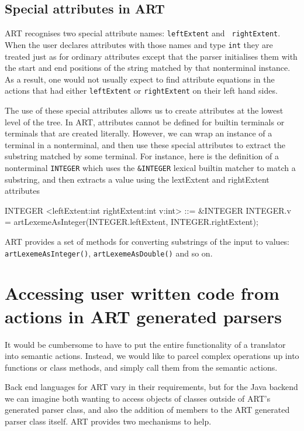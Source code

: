 \subsection{Special attributes in ART}
ART recognises two special attribute names: {\tt leftExtent} and {\tt
  rightExtent}. When the user declares attributes with those names and
type {\tt int} they are treated just as for ordinary attributes except
that the parser initialises them with the start and end positions of
the string matched by that nonterminal instance. As a result, one
would not usually expect to find attribute equations in the actions that had either {\tt leftExtent} or {\tt rightExtent} on their left hand sides.

The use of these special attributes allows us to create attributes at the lowest level of the tree.
In ART, attributes cannot be defined for builtin terminals or terminals that are created literally. However, we can wrap an instance of a terminal in a nonterminal, and then use these special attributes to extract the substring matched by some terminal. For instance, here is the definition of a
nonterminal {\tt INTEGER} which uses the \verb+&INTEGER+ lexical
builtin matcher to match a substring, and then extracts a value using
the lextExtent and rightExtent attributes

\begin{bnfblock}
INTEGER <leftExtent:int rightExtent:int v:int> ::= &INTEGER 
{INTEGER.v = artLexemeAsInteger(INTEGER.leftExtent, INTEGER.rightExtent);}
\end{bnfblock}

ART provides a set of methods for converting substrings of the input
to values: \verb+artLexemeAsInteger()+, \verb+artLexemeAsDouble()+
and so on.  

\section{Accessing user written code from actions in ART generated parsers}
It would be cumbersome to have to put the entire functionality of a
translator into semantic actions. Instead, we would like to parcel
complex operations up into functions or class methods, and simply call
them from the semantic actions.

Back end languages for ART vary in their requirements, but for the
Java backend we can imagine both wanting to access objects of classes
outside of ART's generated parser class, and also the addition of
members to the ART generated parser class itself. ART provides two
mechanisms to help.

